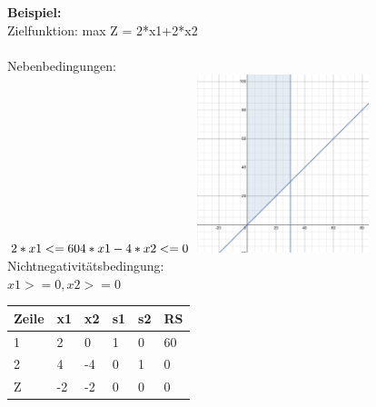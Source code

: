 \textbf{Beispiel: }\\
Zielfunktion: max Z = 2*x1+2*x2\\
\\
Nebenbedingungen:\\
\begin{math}
2*x1 <= 60\\
4*x1-4*x2 <= 0\\
\end{math}
\includegraphics[width=5cm,right]{images/IMG_degenerierte_Losung.jpeg}
Nichtnegativitätsbedingung:\\
\begin{math}
x1 >= 0, x2 >= 0
\end{math}
\\
\begin{table}[!ht]
\begin{tabular}{|l|l|l|l|l|l|}
\hline
\rowcolor[HTML]{C0C0C0} 
Zeile                     & x1                        & x2 & s1 & s2 & RS \\ \hline
\rowcolor[HTML]{FFFFFF} 
\cellcolor[HTML]{C0C0C0}1 & 2                         & 0  & 1  & 0  & 60 \\ \hline
\rowcolor[HTML]{FFFFFF} 
\cellcolor[HTML]{C0C0C0}2 & \cellcolor[HTML]{CBCEFB}4 & -4 & 0  & 1  & 0  \\ \hline
\rowcolor[HTML]{FFFFFF} 
\cellcolor[HTML]{C0C0C0}Z & -2                        & -2 & 0  & 0  & 0  \\ \hline
\end{tabular}
\end{table}
\\
